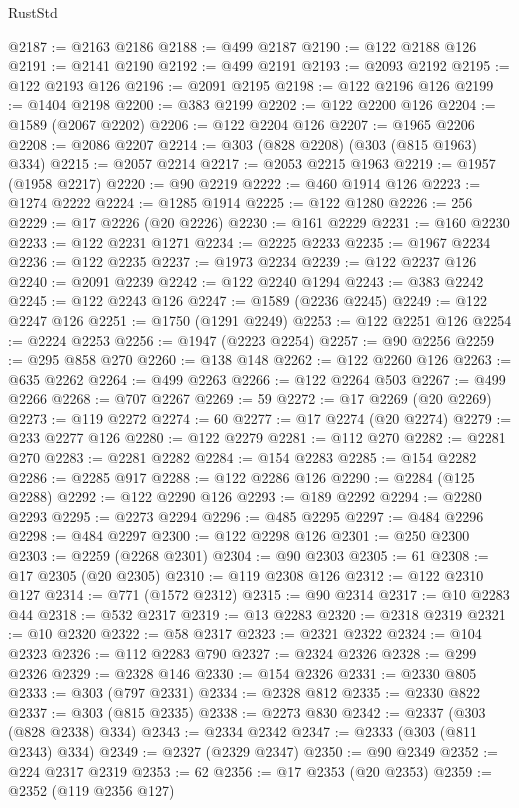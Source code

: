 \begin{lexlean}{RustStd}
\begin{coremodule}
{\begin{coremodule}
{{{{{{{{{{{{{{{{{{{{{{{{{{{{{{{{{{{{{{{{{{{{{{{{{{{{{{{{{{{{{{{{{{{{@2187 := @2163 @2186
@2188 := @499 @2187
@2190 := @122 @2188 @126
@2191 := @2141 @2190
@2192 := @499 @2191
@2193 := @2093 @2192
@2195 := @122 @2193 @126
@2196 := @2091 @2195
@2198 := @122 @2196 @126
@2199 := @1404 @2198
@2200 := @383 @2199
@2202 := @122 @2200 @126
@2204 := @1589 (@2067 @2202)
@2206 := @122 @2204 @126
@2207 := @1965 @2206
@2208 := @2086 @2207
@2214 := @303 (@828 @2208) (@303 (@815 @1963) @334)
@2215 := @2057 @2214
@2217 := @2053 @2215 @1963
@2219 := @1957 (@1958 @2217)
@2220 := @90 @2219
@2222 := @460 @1914 @126
@2223 := @1274 @2222
@2224 := @1285 @1914
@2225 := @122 @1280
@2226 := 256
@2229 := @17 @2226 (@20 @2226)
@2230 := @161 @2229
@2231 := @160 @2230
@2233 := @122 @2231 @1271
@2234 := @2225 @2233
@2235 := @1967 @2234
@2236 := @122 @2235
@2237 := @1973 @2234
@2239 := @122 @2237 @126
@2240 := @2091 @2239
@2242 := @122 @2240 @1294
@2243 := @383 @2242
@2245 := @122 @2243 @126
@2247 := @1589 (@2236 @2245)
@2249 := @122 @2247 @126
@2251 := @1750 (@1291 @2249)
@2253 := @122 @2251 @126
@2254 := @2224 @2253
@2256 := @1947 (@2223 @2254)
@2257 := @90 @2256
@2259 := @295 @858 @270
@2260 := @138 @148
@2262 := @122 @2260 @126
@2263 := @635 @2262
@2264 := @499 @2263
@2266 := @122 @2264 @503
@2267 := @499 @2266
@2268 := @707 @2267
@2269 := 59
@2272 := @17 @2269 (@20 @2269)
@2273 := @119 @2272
@2274 := 60
@2277 := @17 @2274 (@20 @2274)
@2279 := @233 @2277 @126
@2280 := @122 @2279
@2281 := @112 @270
@2282 := @2281 @270
@2283 := @2281 @2282
@2284 := @154 @2283
@2285 := @154 @2282
@2286 := @2285 @917
@2288 := @122 @2286 @126
@2290 := @2284 (@125 @2288)
@2292 := @122 @2290 @126
@2293 := @189 @2292
@2294 := @2280 @2293
@2295 := @2273 @2294
@2296 := @485 @2295
@2297 := @484 @2296
@2298 := @484 @2297
@2300 := @122 @2298 @126
@2301 := @250 @2300
@2303 := @2259 (@2268 @2301)
@2304 := @90 @2303
@2305 := 61
@2308 := @17 @2305 (@20 @2305)
@2310 := @119 @2308 @126
@2312 := @122 @2310 @127
@2314 := @771 (@1572 @2312)
@2315 := @90 @2314
@2317 := @10 @2283 @44
@2318 := @532 @2317
@2319 := @13 @2283
@2320 := @2318 @2319
@2321 := @10 @2320
@2322 := @58 @2317
@2323 := @2321 @2322
@2324 := @104 @2323
@2326 := @112 @2283 @790
@2327 := @2324 @2326
@2328 := @299 @2326
@2329 := @2328 @146
@2330 := @154 @2326
@2331 := @2330 @805
@2333 := @303 (@797 @2331)
@2334 := @2328 @812
@2335 := @2330 @822
@2337 := @303 (@815 @2335)
@2338 := @2273 @830
@2342 := @2337 (@303 (@828 @2338) @334)
@2343 := @2334 @2342
@2347 := @2333 (@303 (@811 @2343) @334)
@2349 := @2327 (@2329 @2347)
@2350 := @90 @2349
@2352 := @224 @2317 @2319
@2353 := 62
@2356 := @17 @2353 (@20 @2353)
@2359 := @2352 (@119 @2356 @127)
}}}}}}}}}}}}}}}}}}}}}}}}}}}}}}}}}}}}}}}}}}}}}}}}}}}}}}}}}}}}}}}}}}}}
\end{coremodule}}
\end{coremodule}
\end{lexlean}

